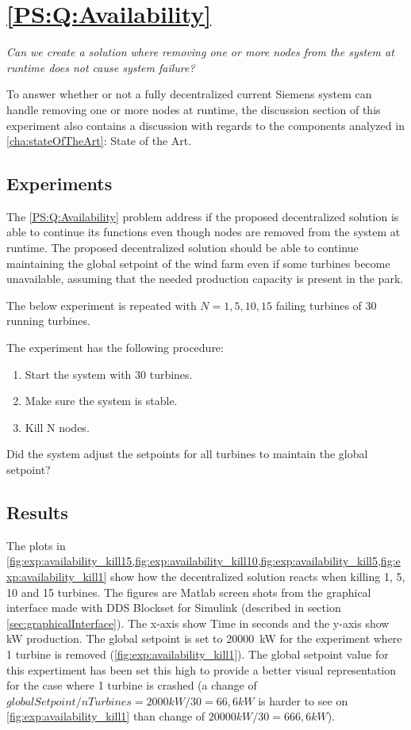 \section{\ref{PS:Q:Availability}}

\textit{Can we create a solution where removing one or more nodes from the system at runtime does not cause system failure?}\newline\newline

\noindent To answer whether or not a fully decentralized current Siemens system can handle removing one or more nodes at runtime, the discussion section of this experiment also contains a discussion with regards to the components analyzed in \cref{cha:stateOfTheArt}: State of the Art.

\subsection{Experiments}
The \ref{PS:Q:Availability} problem address if the proposed decentralized solution is able to continue its functions even though nodes are removed from the system at runtime.
The proposed decentralized solution should be able to continue maintaining the global setpoint of the wind farm even if some turbines become unavailable, assuming that the needed production capacity is present in the park.

The below experiment is repeated with $N = 1, 5, 10, 15$ failing turbines of 30 running turbines.

The experiment has the following procedure:
\begin{enumerate}
	\item Start the system with 30 turbines.
	\item Make sure the system is stable.
	\item Kill N nodes.
\end{enumerate}

Did the system adjust the setpoints for all turbines to maintain the global setpoint?

\subsection{Results}
\label{sec:res:availability}
The plots in \cref{fig:exp:availability_kill15,fig:exp:availability_kill10,fig:exp:availability_kill5,fig:exp:availability_kill1} show how the decentralized solution reacts when killing 1, 5, 10 and 15 turbines. The figures are Matlab screen shots from the graphical interface made with DDS Blockset for Simulink (described in section \cref{sec:graphicalInterface}). The x-axis show Time in seconds and the y-axis show kW production. The global setpoint is set to 20000~kW for the experiment where 1 turbine is removed (\cref{fig:exp:availability_kill1}). The global setpoint value for this expertiment has been set this high to provide a better visual representation for the case where 1 turbine is crashed (a change of $globalSetpoint/nTurbines=2000kW/30=66,6kW$ is harder to see on \cref{fig:exp:availability_kill1} than change of $20000kW/30=666,6kW$). 

